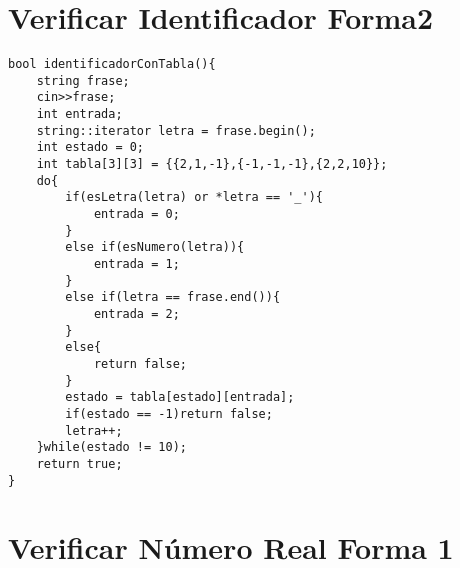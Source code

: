 \documentclass[a4paper,12pt]{article}
\begin{document}
\section{Verificar Identificador Forma2}

\begin{lstlisting}
bool identificadorConTabla(){
    string frase;
    cin>>frase;
    int entrada;
    string::iterator letra = frase.begin();
    int estado = 0;
    int tabla[3][3] = {{2,1,-1},{-1,-1,-1},{2,2,10}};
    do{
        if(esLetra(letra) or *letra == '_'){
            entrada = 0;
        }
        else if(esNumero(letra)){
            entrada = 1;
        }
        else if(letra == frase.end()){
            entrada = 2;
        }
        else{
            return false;
        }
        estado = tabla[estado][entrada];
        if(estado == -1)return false;
        letra++;
    }while(estado != 10);
    return true;
}
\end{lstlisting}

\section{Verificar Número Real Forma 1}
\end{document}
